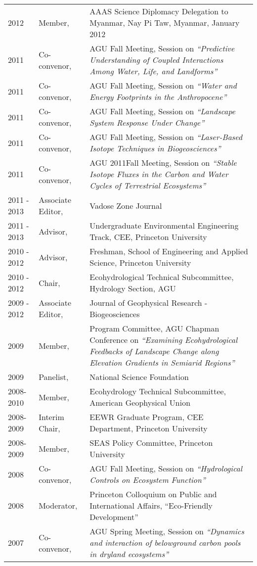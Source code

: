 \documentclass[10pt]{article}
\begin{document}
\begin{longtable}{p{.75in} p{1in} p{4.5in}}
2012 & Member, & AAAS Science Diplomacy Delegation to Myanmar, Nay Pi Taw, Myanmar, January 2012 \\
2011  & Co-convenor, & AGU Fall Meeting, Session on \emph{``Predictive Understanding of Coupled Interactions Among Water, Life, and Landforms''} \\
2011  & Co-convenor, & AGU Fall Meeting, Session on \emph{``Water and Energy Footprints in the Anthropocene''} \\
2011  & Co-convenor, & AGU Fall Meeting, Session on \emph{``Landscape System Response Under Change''} \\
2011  & Co-convenor, & AGU Fall Meeting, Session on \emph{``Laser-Based Isotope Techniques in Biogeosciences''} \\
2011  & Co-convenor, & AGU 2011Fall Meeting, Session on \emph{``Stable Isotope Fluxes in the Carbon and Water Cycles of Terrestrial Ecosystems''} \\
2011 - 2013 & Associate Editor, & Vadose Zone Journal \\
2011 - 2013 & Advisor, & Undergraduate Environmental Engineering Track, CEE, Princeton University \\ 
2010 - 2012 & Advisor, & Freshman, School of Engineering and Applied Science, Princeton University \\ 
2010 - 2012 & Chair, & Ecohydrological Technical Subcommittee, Hydrology Section, AGU \\ 
2009 - 2012 & Associate Editor, & Journal of Geophysical Research - Biogeosciences \\ 
2009 & Member, & Program Committee, AGU Chapman Conference on \emph{``Examining Ecohydrological Feedbacks of Landscape Change along Elevation Gradients in Semiarid Regions''} \\
2009 & Panelist, & National Science Foundation  \\
2008-2010         & Member, & Ecohydrology Technical Subcommittee, American Geophysical Union \\
2008-2009 & Interim Chair, & EEWR Graduate Program, CEE Department, Princeton University \\
2008-2009 & Member, & SEAS Policy Committee, Princeton University \\
2008 & Co-convenor, & AGU Fall Meeting, Session on \emph{``Hydrological Controls on Ecosystem Function'' }  \\
2008 & Moderator, & Princeton Colloquium on Public and International Affairs, ``Eco-Friendly Development''  \\
2007 & Co-convenor, & AGU Spring Meeting, Session on \emph{``Dynamics and interaction of belowground carbon pools in dryland ecosystems''} \\

\end{longtable}
\end{document}
